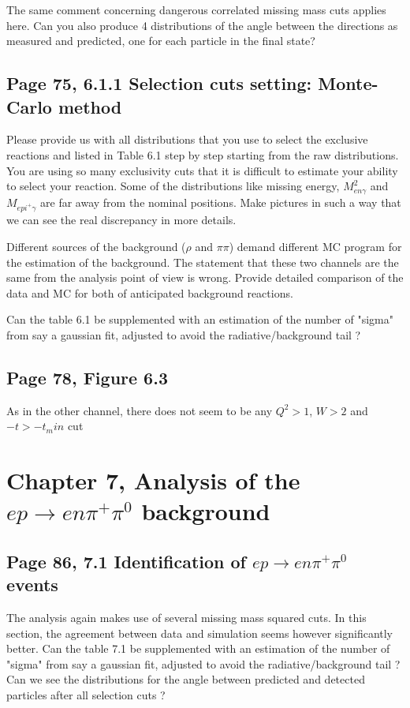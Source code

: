 \documentclass[11pt]{paper}
\begin{document}
The same comment concerning dangerous correlated missing mass cuts applies here.
Can you also produce 4 distributions of the angle between the directions as measured and predicted, one for each particle in the final state?

\subsection*{Page 75, 6.1.1 Selection cuts setting: Monte-Carlo method} 

Please provide us with all distributions that you use to select the exclusive reactions and listed in Table 6.1 step by step starting from the raw distributions. 
You are using so many exclusivity cuts that it is difficult to estimate your ability to select your reaction. 
Some of the distributions like missing energy, $M^2_{en\gamma}$ and $M_{epi^+\gamma} $ are
far away from the nominal positions. Make pictures in such a way that we can see the real discrepancy in more details. 

Different sources of the background ($\rho$ and $\pi\pi$) demand different MC program for the estimation of the background.
The statement that these two channels are the same from the analysis point of view is wrong. Provide detailed comparison of the data and MC for both of anticipated background reactions. 

Can the table 6.1 be supplemented with an estimation of the number of "sigma" from say a gaussian fit, adjusted to avoid the radiative/background tail ?

\subsection*{Page 78, Figure 6.3}
As in the other channel, there does not seem to be any $Q^2>1$, $W>2$ and $-t>-t_min $ cut
 
\section*{Chapter 7, Analysis of the $ep\rightarrow en\pi^+\pi^0$ background}

\subsection*{Page 86, 7.1 Identification of $ep\rightarrow en\pi^+\pi^0$ events}

The analysis again makes use of several missing mass squared cuts.
In this section, the agreement between data and simulation seems however significantly better.
Can the table 7.1 be supplemented with an estimation of the number of "sigma" from say a gaussian fit, adjusted to avoid the radiative/background tail ?
Can we see the distributions for the angle between predicted and detected particles after all selection cuts ?
\end{document}
